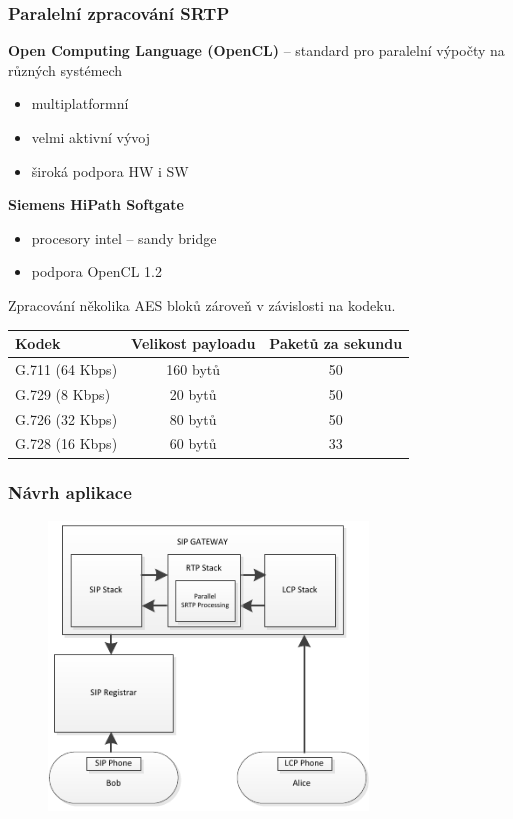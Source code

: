 \documentclass[10pt, xcolor=pdflatex, dvipsnames, table]{beamer}
\begin{document}
\begin{frame}
\frametitle{Paralelní zpracování SRTP}
\textbf{Open Computing Language (OpenCL)} -- standard pro paralelní výpočty na různých systémech
\begin{itemize}
\item multiplatformní
\item velmi aktivní vývoj
\item široká podpora HW i SW 
\end{itemize}

\vspace{1.5em}
\textbf{Siemens HiPath Softgate} 
\begin{itemize}
    \item procesory intel -- sandy bridge
    \item podpora OpenCL 1.2
\end{itemize}

\vspace{1.5em}
Zpracování několika AES bloků zároveň v závislosti na kodeku.
\begin{center}
\begin{tabular}{|l|cc|}\hline%
  Kodek & Velikost payloadu & Paketů za sekundu\\\hline
  G.711 (64 Kbps)   & 160 bytů    & 50 \\
  G.729 (8 Kbps)    & 20 bytů     & 50 \\
  G.726 (32 Kbps)   & 80 bytů     & 50 \\
  G.728 (16 Kbps)   & 60 bytů     & 33 \\
 \hline
\end{tabular}
\end{center}
\end{frame}





\begin{frame}
\frametitle{Návrh aplikace}
\begin{figure}[H]
  \centering
      \includegraphics[width=8.5cm,keepaspectratio]{fig/scenario1.pdf}
  \label{fig:comp}
\end{figure}
\end{frame}
\end{document}
